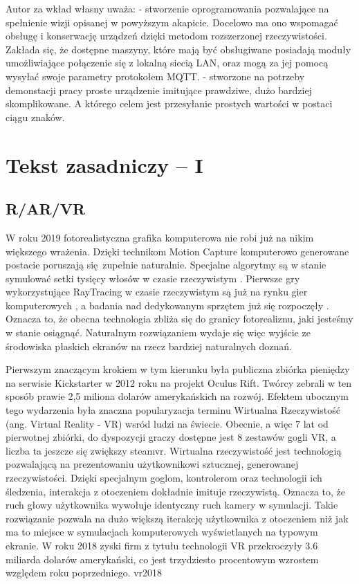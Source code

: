 \documentclass[12pt,twoside]{article}
\begin{document}
Autor za wkład własny uważa:
- stworzenie oprogramowania pozwalające na spełnienie wizji opisanej w powyższym akapicie. Docelowo ma ono wspomagać obsługę i konserwację urządzeń dzięki metodom rozszerzonej rzeczywistości. Zakłada się, że dostępne maszyny, które mają być obsługiwane posiadają moduły umożliwiające połączenie się z lokalną siecią LAN, oraz mogą za jej pomocą wysyłać swoje parametry protokołem MQTT.
- stworzone na potrzeby demonstacji pracy proste urządzenie imitujące prawdziwe, dużo bardziej skomplikowane. A którego celem jest przesyłanie prostych wartości w postaci ciągu znaków.


\clearpage


\section{Tekst zasadniczy -- I}

\subsection {R/AR/VR}
W roku 2019 fotorealistyczna grafika komputerowa nie robi już na nikim większego wrażenia. Dzięki technikom Motion Capture komputerowo generowane postacie poruszają się zupełnie naturalnie. Specjalne algorytmy są w stanie symulować setki tysięcy włosów w czasie rzeczywistym \cite{hairworks}. Pierwsze gry wykorzystujące RayTracing w czasie rzeczywistym są już na rynku gier komputerowych \cite{raytracinggames}, a badania nad dedykowanym sprzętem już się rozpoczęły \cite{raytracinghardware}. Oznacza to, że obecna technologia zbliża się do granicy fotorealiznu, jaki jesteśmy w stanie osiągnąć. Naturalnym rozwiązaniem wydaje się więc wyjście ze środowiska płaskich ekranów na rzecz bardziej naturalnych doznań.

Pierwszym znaczącym krokiem w tym kierunku była publiczna zbiórka pieniędzy na serwisie Kickstarter w 2012 roku na projekt Oculus Rift. Twórcy zebrali w ten sposób prawie 2,5 miliona dolarów amerykańskich na rozwój. Efektem ubocznym tego wydarzenia była znaczna popularyzacja terminu Wirtualna Rzeczywistość (ang. Virtual Reality - VR) wsród ludzi na świecie. Obecnie, a więc 7 lat od pierwotnej zbiórki, do dyspozycji graczy dostępne jest 8 zestawów gogli VR, a liczba ta jeszcze się zwiększy {steamvr}. Wirtualna rzeczywistość jest technologią pozwalającą na prezentowaniu użytkownikowi sztucznej, generowanej rzeczywistości. Dzięki specjalnym goglom, kontrolerom oraz technologii ich śledzenia, interakcja z otoczeniem dokładnie imituje rzeczywistą. Oznacza to, że ruch głowy użytkownika wywołuje identyczny ruch kamery w symulacji. Takie rozwiązanie pozwala na dużo większą iterakcję użytkownika z otoczeniem niż jak ma to miejsce w symulacjach komputerowych wyświetlanych na typowym ekranie. W roku 2018 zyski firm z tytułu technologii VR przekroczyły 3.6 miliarda dolarów amerykański, co jest trzydziesto procentowym wzrostem względem roku poprzedniego. {vr2018}
\end{document}
